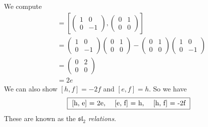 We compute
\begin{align*}
	[h, e] &= \left[
	\begin{pmatrix}
		1 & 0 \\
		0 & -1
	\end{pmatrix},
	\begin{pmatrix}
		0 & 1 \\
		0 & 0
	\end{pmatrix}
	\right] \\
	&=
	\begin{pmatrix}
		1 & 0 \\
		0 & -1
	\end{pmatrix}
	\begin{pmatrix}
		0 & 1 \\
		0 & 0
	\end{pmatrix}
	-
	\begin{pmatrix}
		0 & 1 \\
		0 & 0
	\end{pmatrix}
	\begin{pmatrix}
		1 & 0 \\
		0 & -1
	\end{pmatrix} \\
	&=
	\begin{pmatrix}
		0 & 2 \\
		0 & 0
	\end{pmatrix} \\ 
	&= 2e
\end{align*}
We can also show $[h, f] = -2f$ and $[e, f] = h$. So we have
\[
\fbox{
	[h, e] = 2e, \quad [e, f] = h, \quad [h, f] = -2f
}
\]
These are known as the \emph{$\mathfrak{sl}_2$ relations}.
